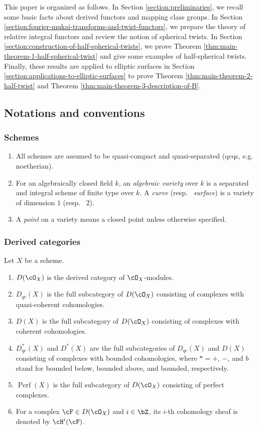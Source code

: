 \documentclass[12pt]{amsart}
\numberwithin{equation}{section}
\theoremstyle{plain}
\theoremstyle{definition}
\DeclareMathOperator{\Perf}{\mathrm{Perf}}
\begin{document}
This paper is organized as follows.
In Section \ref{section:preliminaries}, we recall some basic facts about derived functors and mapping class groups.
In Section \ref{section:fourier-mukai-transforms-and-twist-functors}, we prepare the theory of relative integral functors and review the notion of spherical twists.
In Section \ref{section:construction-of-half-spherical-twists}, we prove Theorem \ref{thm:main-theorem-1-half-spherical-twist} and give some examples of half-spherical twists.
Finally, these results are applied to elliptic surfaces in Section \ref{section:applications-to-elliptic-surfaces} to prove Theorem \ref{thm:main-theorem-2-half-twist} and Theorem \ref{thm:main-theorem-3-description-of-B}.




\subsection*{Notations and conventions}
\subsubsection*{Schemes}
\begin{enumerate}
    \item All schemes are assumed to be quasi-compact and quasi-separated (qcqs, e.g.~ noetherian).
    \item For an algebraically closed field $k$, an \emph{algebraic variety} over $k$ is a separated and integral scheme of finite type over $k$. A \emph{curve} (resp.~ \emph{surface}) is a variety of dimension $1$ (resp.~ $2$).
    \item A \emph{point} on a variety means a closed point unless otherwise specified.
\end{enumerate}


\subsubsection*{Derived categories}
Let $X$ be a scheme.
\begin{enumerate}
    \item $D(\cO_X)$ is the derived category of $\cO_X$-modules.
    \item $D_{qc}(X)$ is the full subcategory of $D(\cO_X)$ consisting of complexes with quasi-coherent cohomologies.
    \item $D(X)$ is the full subcategory of $D(\cO_X)$ consisting of complexes with coherent cohomologies.
    \item $D_{qc}^*(X)$ and $D^*(X)$ are the full subcategories of $D_{qc}(X)$ and $D(X)$ consisting of complexes with bounded cohomologies, where $* = +$, $-$, and $b$ stand for bounded below, bounded above, and bounded, respectively.
    \item $\Perf(X)$ is the full subcategory of $D(\cO_X)$ consisting of perfect complexes.
    \item For a complex $\cF \in D(\cO_X)$ and $i \in \bZ$, its $i$-th cohomology sheaf is denoted by $\cH^i(\cF)$.
\end{enumerate}
\end{document}
